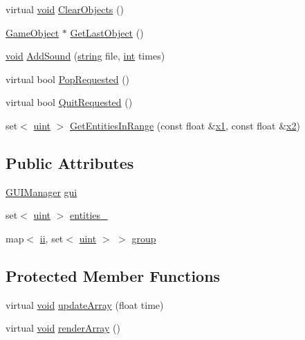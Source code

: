 \begin{DoxyCompactItemize}
\item 
virtual \hyperlink{_s_d_l__opengles2__gl2ext_8h_ae5d8fa23ad07c48bb609509eae494c95}{void} \hyperlink{class_state_a682fd5c0e402a6d7f8f480aa7356d047}{Clear\-Objects} ()
\item 
\hyperlink{class_game_object}{Game\-Object} $\ast$ \hyperlink{class_state_ab70325f4e708fd6375520c750a02e10b}{Get\-Last\-Object} ()
\item 
\hyperlink{_s_d_l__opengles2__gl2ext_8h_ae5d8fa23ad07c48bb609509eae494c95}{void} \hyperlink{class_state_ac73857c4657768f19d2114ef4041549c}{Add\-Sound} (\hyperlink{_s_d_l__opengl__glext_8h_ae84541b4f3d8e1ea24ec0f466a8c568b}{string} file, \hyperlink{_s_d_l__thread_8h_a6a64f9be4433e4de6e2f2f548cf3c08e}{int} times)
\item 
virtual bool \hyperlink{class_state_a3ce3e5d9230192eaab672349e5937a09}{Pop\-Requested} ()
\item 
virtual bool \hyperlink{class_state_a75cebfa3285922a359d5f946c138d129}{Quit\-Requested} ()
\item 
set$<$ \hyperlink{common_8hpp_a69aa29b598b851b0640aa225a9e5d61d}{uint} $>$ \hyperlink{class_state_aa43c296bed2a9cf771cde8b0877c0c86}{Get\-Entities\-In\-Range} (const float \&\hyperlink{_s_d_l__opengl__glext_8h_a49825216c96caaeb09237b36651181c5}{x1}, const float \&\hyperlink{_s_d_l__opengl__glext_8h_a7b907a03236685c534d89d604cff23c8}{x2})
\end{DoxyCompactItemize}
\subsection*{Public Attributes}
\begin{DoxyCompactItemize}
\item 
\hyperlink{class_g_u_i_manager}{G\-U\-I\-Manager} \hyperlink{class_state_aca632a80920808dc1aad399ec560f84f}{gui}
\item 
set$<$ \hyperlink{common_8hpp_a69aa29b598b851b0640aa225a9e5d61d}{uint} $>$ \hyperlink{class_state_a19fc3c4e3d962de483ca940be49cd113}{entities\-\_\-}
\item 
map$<$ \hyperlink{common_8hpp_a45680061f7e655744e42cdfa30b44fa8}{ii}, set$<$ \hyperlink{common_8hpp_a69aa29b598b851b0640aa225a9e5d61d}{uint} $>$ $>$ \hyperlink{class_state_a18dfb560751c969cf8d6583b55fa2885}{group}
\end{DoxyCompactItemize}
\subsection*{Protected Member Functions}
\begin{DoxyCompactItemize}
\item 
virtual \hyperlink{_s_d_l__opengles2__gl2ext_8h_ae5d8fa23ad07c48bb609509eae494c95}{void} \hyperlink{class_state_a23287331ba19c3a06e49b5c77bc7bfc5}{update\-Array} (float time)
\item 
virtual \hyperlink{_s_d_l__opengles2__gl2ext_8h_ae5d8fa23ad07c48bb609509eae494c95}{void} \hyperlink{class_state_aaaad11346a36120afd9c4049f0fa1798}{render\-Array} ()
\end{DoxyCompactItemize}
